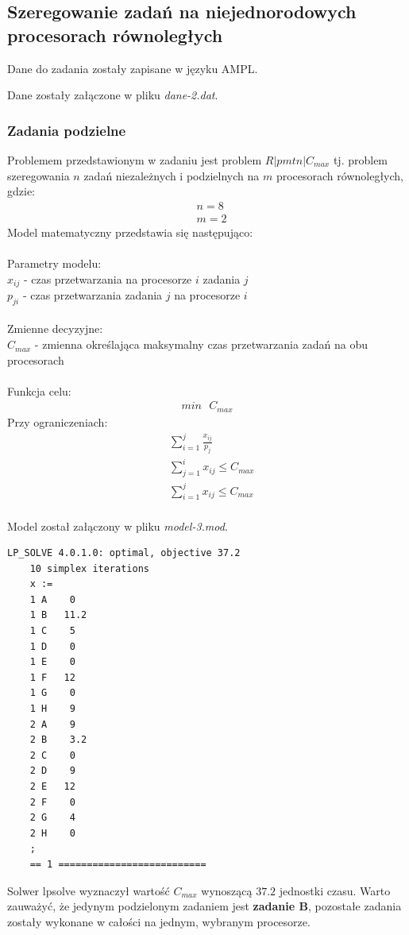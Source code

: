 \documentclass[
    12pt, %
]{../fphw}
\begin{document}
\subsection{Szeregowanie zadań na niejednorodowych procesorach równoległych}
Dane do zadania zostały zapisane w języku AMPL.

Dane zostały załączone w pliku \textit{dane-2.dat}.
\subsubsection{Zadania podzielne}
Problemem przedstawionym w zadaniu jest problem \(R|pmtn|C_{max}\)
tj. problem szeregowania \(n\) zadań niezależnych i podzielnych
na \(m\) procesorach równoległych, gdzie:
\begin{align*}
     & n = 8 \\
     & m = 2
\end{align*}
Model matematyczny przedstawia się następująco: \\ \\
Parametry modelu: \\
\(x_{ij}\) - czas przetwarzania na procesorze \(i\) zadania \(j\) \\
\(p_{ji}\) - czas przetwarzania zadania \(j\) na procesorze \(i\) \\ \\
Zmienne decyzyjne: \\
\(C_{max}\) - zmienna określająca maksymalny czas przetwarzania zadań na obu procesorach \\ \\
Funkcja celu: \\
\begin{align*}
    min \text{ } C_{max}
\end{align*}
Przy ograniczeniach: \\
\begin{align*}
     & \sum^j_{i=1} \frac{x_{ij}}{p_j}  \\
     & \sum^i_{j=1} x_{ij} \leq C_{max} \\
     & \sum^j_{i=1} x_{ij} \leq C_{max} \\
\end{align*}


Model został załączony w pliku \textit{model-3.mod}.


\begin{lstlisting}[caption=Rozwiązanie znalezione solwerem lpsolve]
    LP_SOLVE 4.0.1.0: optimal, objective 37.2
    10 simplex iterations
    x :=
    1 A    0
    1 B   11.2
    1 C    5
    1 D    0
    1 E    0
    1 F   12
    1 G    0
    1 H    9
    2 A    9
    2 B    3.2
    2 C    0
    2 D    9
    2 E   12
    2 F    0
    2 G    4
    2 H    0
    ;
    == 1 ==========================
\end{lstlisting}
Solwer lpsolve wyznaczył wartość \(C_{max}\) wynoszącą \(37.2\) jednostki czasu.
Warto zauważyć, że jedynym podzielonym zadaniem jest \textbf{zadanie B},
pozostałe zadania zostały wykonane w całości na jednym, wybranym procesorze.
\end{document}
